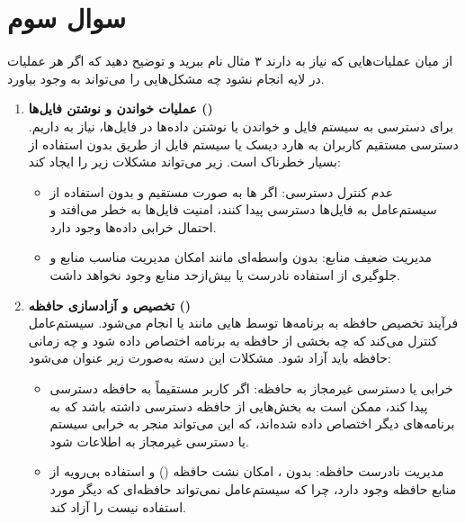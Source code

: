 \section{سوال سوم}

از میان عملیات‌هایی که نیاز به  دارند ۳ مثال نام ببرید و توضیح دهید که اگر هر عملیات در لایه  انجام نشود چه مشکل‌هایی را می‌تواند به وجود بیاورد.


\begin{qsolve}
	\begin{enumerate}
		\item 
	\textbf{	عملیات خواندن و نوشتن فایل‌ها ()}\\
		 برای دسترسی به سیستم فایل و خواندن یا نوشتن داده‌ها در فایل‌ها، نیاز به  داریم. دسترسی مستقیم کاربران به هارد دیسک یا سیستم فایل از طریق  بدون استفاده از  بسیار خطرناک است. زیر می‌تواند مشکلات زیر را ایجاد کند:
		 
		 \begin{itemize}
		 	\item 
		 	عدم کنترل دسترسی: اگر  ها به صورت مستقیم و بدون استفاده از سیستم‌عامل به فایل‌ها دسترسی پیدا کنند، امنیت فایل‌ها به خطر می‌افتد و احتمال خرابی داده‌ها وجود دارد.
		 	
		 	\item 
		 	مدیریت ضعیف منابع: بدون واسطه‌ای مانند  امکان مدیریت مناسب منابع و جلوگیری از استفاده نادرست یا بیش‌ازحد منابع وجود نخواهد داشت.
		 \end{itemize}
		
		
		
		\item 
	\textbf{	تخصیص و آزادسازی حافظه ()}\\
		فرآیند تخصیص حافظه به برنامه‌ها توسط هایی مانند  یا  انجام می‌شود. سیستم‌عامل کنترل می‌کند که چه بخشی از حافظه به برنامه اختصاص داده شود و چه زمانی حافظه باید آزاد شود. مشکلات این دسته به‌صورت زیر عنوان می‌شود:
		
		\begin{itemize}
			\item 
			خرابی یا دسترسی غیرمجاز به حافظه: اگر کاربر مستقیماً به حافظه دسترسی پیدا کند، ممکن است به بخش‌هایی از حافظه دسترسی داشته باشد که به برنامه‌های دیگر اختصاص داده شده‌اند، که این می‌تواند منجر به خرابی سیستم یا دسترسی غیرمجاز به اطلاعات شود.
			
			\item 
			مدیریت نادرست حافظه: بدون ، امکان نشت حافظه () و استفاده بی‌رویه از منابع حافظه وجود دارد، چرا که سیستم‌عامل نمی‌تواند حافظه‌ای که دیگر مورد استفاده نیست را آزاد کند.
		\end{itemize}
		

\end{enumerate}
\end{qsolve}
